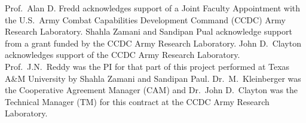 \documentclass{arlticle}
\begin{document}

\arltitlepage%

\begin{createSFtwoNINEeight}
    \SFitemFIVEd{}
    \SFitemFIFTEEN{%
    }
    \SFitemEIGHTEEN{\ref{TotPages}}%
    \SFitemNINETEENa{%
    }
    \SFitemNINETEENb{%
    }
\end{createSFtwoNINEeight}
%

\tableofcontents%
\listoffigures%
\pagebreak
\listoftables*%
\acknowledgments
Prof.\ Alan D. Fredd acknowledges support of a Joint Faculty Appointment with the U.S.\ Army Combat Capabilities Development Command (CCDC) Army Research Laboratory.  Shahla Zamani and Sandipan Pual acknowledge support from a grant funded by the CCDC Army Research Laboratory.  John D.\ Clayton acknowledges support of the CCDC Army Research Laboratory.  Prof.\ J.N.\ Reddy was the PI for that part of this project performed at Texas A\&M University by Shahla Zamani and Sandipan Paul.  Dr.\ M.\ Kleinberger was the Cooperative Agreement Manager (CAM) and Dr.\ John D.\ Clayton was the Technical Manager (TM) for this contract at the CCDC Army Research Laboratory.
\end{document}
